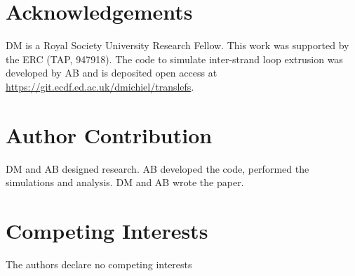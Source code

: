 \documentclass[aps,prl,twocolumn,a4paper,10pt,notitlepage,footinbib,nobalancelastpage,superscriptaddress,showpacs,floatfix]{revtex4-1}%
\begin{document}
\section{Acknowledgements}
DM is a Royal Society University Research Fellow. This work was supported by the ERC (TAP, 947918). The code to simulate inter-strand loop extrusion was developed by AB and is deposited open access at \url{https://git.ecdf.ed.ac.uk/dmichiel/translefs}. 

\section{Author Contribution}
DM and AB designed research. AB developed the code, performed the simulations and analysis. DM and AB wrote the paper.

\section{Competing Interests}
The authors declare no competing interests



\end{document}
